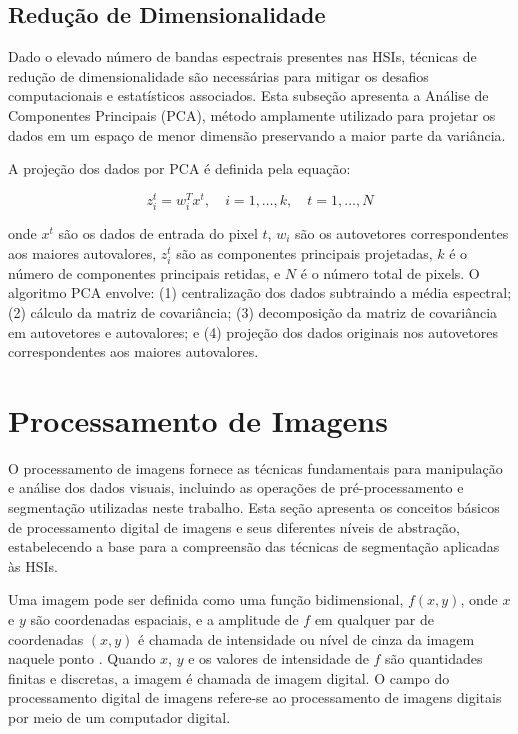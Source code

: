 \subsection{Redução de Dimensionalidade}

Dado o elevado número de bandas espectrais presentes nas HSIs, técnicas de redução de dimensionalidade são necessárias para mitigar os desafios computacionais e estatísticos associados. Esta subseção apresenta a Análise de Componentes Principais (PCA), método amplamente utilizado para projetar os dados em um espaço de menor dimensão preservando a maior parte da variância.

A projeção dos dados por PCA é definida pela equação:

\begin{equation}
z_i^t = w_i^T x^t, \quad i=1,\ldots,k, \quad t=1,\ldots,N
\end{equation}

\noindent onde $x^t$ são os dados de entrada do pixel $t$, $w_i$ são os autovetores correspondentes aos maiores autovalores, $z_i^t$ são as componentes principais projetadas, $k$ é o número de componentes principais retidas, e $N$ é o número total de pixels. O algoritmo PCA envolve: (1) centralização dos dados subtraindo a média espectral; (2) cálculo da matriz de covariância; (3) decomposição da matriz de covariância em autovetores e autovalores; e (4) projeção dos dados originais nos autovetores correspondentes aos maiores autovalores.

\section{Processamento de Imagens}

O processamento de imagens fornece as técnicas fundamentais para manipulação e análise dos dados visuais, incluindo as operações de pré-processamento e segmentação utilizadas neste trabalho. Esta seção apresenta os conceitos básicos de processamento digital de imagens e seus diferentes níveis de abstração, estabelecendo a base para a compreensão das técnicas de segmentação aplicadas às HSIs.

Uma imagem pode ser definida como uma função bidimensional, $f(x, y)$, onde $x$ e $y$ são coordenadas espaciais, e a amplitude de $f$ em qualquer par de coordenadas $(x, y)$ é chamada de intensidade ou nível de cinza da imagem naquele ponto \cite{gonzalez2018digital}. Quando $x$, $y$ e os valores de intensidade de $f$ são quantidades finitas e discretas, a imagem é chamada de imagem digital. O campo do processamento digital de imagens refere-se ao processamento de imagens digitais por meio de um computador digital.

